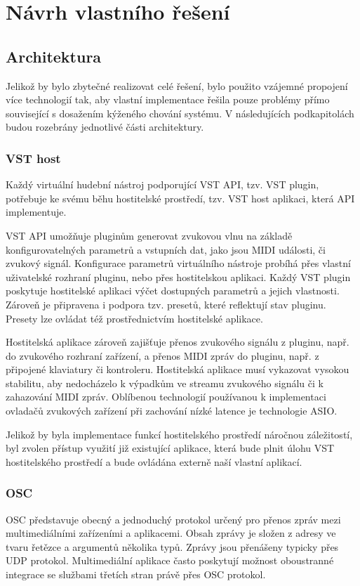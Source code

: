 \documentclass[thesis=M,czech]{FITthesis}[2019/03/06]
\begin{document}
\chapter{Návrh vlastního řešení}
	\section{Architektura}
		Jelikož by bylo zbytečné realizovat celé řešení, bylo použito vzájemné propojení více technologií tak,
		aby vlastní implementace řešila pouze problémy přímo související s dosažením kýženého chování systému. V následujících podkapitolách
		budou rozebrány jednotlivé části architektury.
		
		\subsection{VST host}
			Každý virtuální hudební nástroj podporující VST API, tzv. VST plugin, potřebuje ke svému běhu hostitelské prostředí, tzv. VST host aplikaci, která API implementuje\cite{vstdoc}.
			
			VST API umožňuje pluginům generovat zvukovou vlnu na základě konfigurovatelných
			parametrů a vstupních dat, jako jsou MIDI události, či zvukový signál.
			Konfigurace parametrů virtuálního nástroje probíhá přes vlastní uživatelské rozhraní pluginu, nebo přes hostitelskou aplikaci.
			Každý VST plugin poskytuje hostitelské aplikaci výčet dostupných parametrů a jejich vlastnosti.
			Zároveň je připravena i podpora tzv. presetů, které reflektují stav pluginu. Presety lze ovládat též prostřednictvím
			hostitelské aplikace.
			
			Hostitelská aplikace zároveň zajišťuje přenos zvukového signálu z pluginu, např. do zvukového rozhraní zařízení,
			a přenos MIDI zpráv do pluginu, např. z připojené klaviatury či kontroleru. Hostitelská aplikace musí vykazovat
			vysokou stabilitu, aby nedocházelo k výpadkům ve streamu zvukového signálu či k zahazování MIDI zpráv. Oblíbenou 
			technologií používanou k implementaci ovladačů zvukových zařízení při zachování nízké latence je technologie ASIO\cite{asio}.
			
			Jelikož by byla implementace funkcí hostitelského prostředí náročnou záležitostí, byl zvolen přístup využití
			již existující aplikace, která bude plnit úlohu VST hostitelského prostředí a bude ovládána externě naší vlastní aplikací.
			
		\subsection{OSC}		
			OSC představuje obecný a jednoduchý protokol určený pro přenos zpráv mezi multimediálními zařízeními a aplikacemi\cite{osc}.
			Obsah zprávy je složen z adresy ve tvaru řetězce a argumentů několika typů.
			Zprávy jsou přenášeny typicky přes UDP protokol. Multimediální aplikace často poskytují možnost oboustranné integrace
			se službami třetích stran právě přes OSC protokol.
\end{document}
